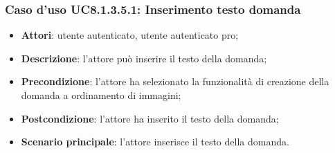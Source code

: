 \subsubsection{Caso d'uso UC8.1.3.5.1: Inserimento testo domanda}
\begin{itemize}
	\item\textbf{Attori}: utente autenticato, utente autenticato pro;
	\item\textbf{Descrizione}: l'attore può inserire il testo della domanda;
	\item\textbf{Precondizione}: l'attore ha selezionato la funzionalità di creazione della domanda a ordinamento di immagini; 
	\item \textbf{Postcondizione}: l'attore ha inserito il testo della domanda;
	\item\textbf{Scenario principale}: l'attore inserisce il testo della domanda. 
\end{itemize}

